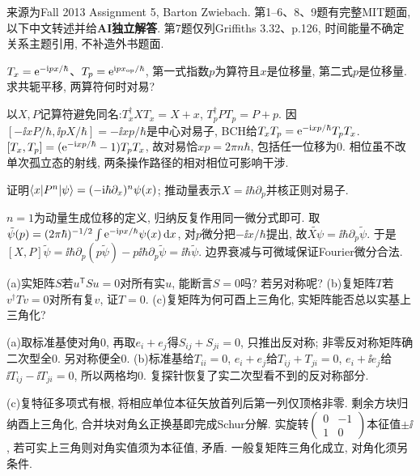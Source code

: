 来源为Fall 2013 Assignment 5, Barton Zwiebach. 第1--6、8、9题有完整MIT题面, 以下中文转述并给\textbf{AI独立解答}. 第7题仅列Griffiths 3.32、p.126, 时间能量不确定关系主题引用, 不补造外书题面.
\begin{exercise}
$T_x=\mathrm e^{-\mathrm i px/\hbar}$、$T_p=\mathrm e^{\mathrm i p x_{\rm op}/\hbar}$, 第一式指数$p$为算符且$x$是位移量, 第二式$p$是位移量. 求共轭平移, 两算符何时对易?
\end{exercise}
\begin{solution}
以$X,P$记算符避免同名:$T_x^\dagger XT_x=X+x$, $T_p^\dagger PT_p=P+p$. 因$[-\ii xP/\hbar,\ii pX/\hbar]=-\ii xp/\hbar$是中心对易子, BCH给$T_xT_p=\mathrm e^{-\mathrm i xp/\hbar}T_pT_x$. $[T_x,T_p]=(\mathrm e^{-\mathrm i xp/\hbar}-1)T_pT_x$, 故对易恰$xp=2\pi n\hbar$, 包括任一位移为0. 相位虽不改单次孤立态的射线, 两条操作路径的相对相位可影响干涉.
\end{solution}
\begin{exercise}
证明$\langle x\rvert P^n\lvert \psi\rangle=(-\mathrm i\hbar\partial_x)^n\psi(x)$; 推动量表示$X=\ii\hbar\partial_p$并核正则对易子.
\end{exercise}
\begin{solution}
$n=1$为动量生成位移的定义, 归纳反复作用同一微分式即可. 取$\tilde\psi(p)=(2\pi\hbar)^{-1/2}\int\mathrm e^{-\mathrm i px/\hbar}\psi(x)\,\mathrm d x$, 对$p$微分把$-\ii x/\hbar$提出, 故$\widetilde{X\psi}=\ii\hbar\partial_p\tilde\psi$. 于是$[X,P]\tilde\psi=\ii\hbar\partial_p(p\tilde\psi)-p\ii\hbar\partial_p\tilde\psi=\ii\hbar\tilde\psi$. 边界衰减与可微域保证Fourier微分合法.
\end{solution}
\begin{exercise}
(a)实矩阵$S$若$u^{\mathsf T}Su=0$对所有实$u$, 能断言$S=0$吗? 若另对称呢? (b)复矩阵$T$若$v^\dagger Tv=0$对所有复$v$, 证$T=0$. (c)复矩阵为何可酉上三角化, 实矩阵能否总以实基上三角化?
\end{exercise}
\begin{solution}
(a)取标准基使对角0, 再取$e_i+e_j$得$S_{ij}+S_{ji}=0$, 只推出反对称; 非零反对称矩阵确二次型全0. 另对称便全0. (b)标准基给$T_{ii}=0$, $e_i+e_j$给$T_{ij}+T_{ji}=0$, $e_i+\ii e_j$给$\ii T_{ij}-\ii T_{ji}=0$, 所以两格均0. 复探针恢复了实二次型看不到的反对称部分.

(c)复特征多项式有根, 将相应单位本征矢放首列后第一列仅顶格非零. 剩余方块归纳酉上三角化, 合并块对角幺正换基即完成Schur分解. 实旋转$\begin{pmatrix}0&-1\\1&0\end{pmatrix}$本征值$\pm\ii$, 若可实上三角则对角实值须为本征值, 矛盾. 一般复矩阵三角化成立, 对角化须另条件.
\end{solution}
